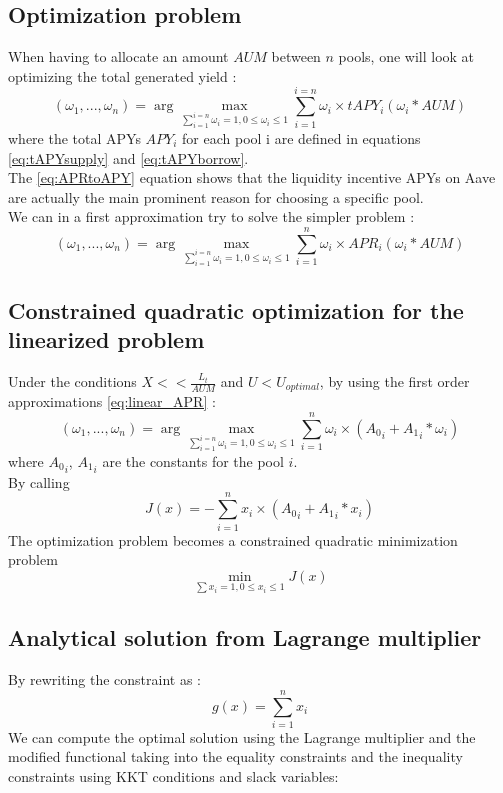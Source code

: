 \documentclass[conference]{IEEEtran}
\begin{document}
\subsection{Optimization problem}
When having to allocate an amount $AUM$ between $n$ pools, one will look at optimizing the total generated yield :  
\begin{equation}
 \left( \omega_1,...,\omega_n \right)   =  \arg \max_{ \sum_{i = 1}^{i = n} \omega_i = 1,0\le \omega_i \le 1} { \sum_{i = 1}^{i = n} \omega_i \times tAPY_i\left(\omega_i * AUM \right) }
\end{equation}
where the total APYs $APY_i$ for each pool i are defined in equations \ref{eq:tAPYsupply} and \ref{eq:tAPYborrow}.\\
The \ref{eq:APRtoAPY} equation shows that the liquidity incentive APYs on Aave are actually the main prominent reason for choosing a specific pool.\\
We can in a first approximation try to solve the simpler problem :
\begin{equation}\label{eq:optim}
 \left( \omega_1,...,\omega_n \right)   =  \arg \max_{ \sum_{i = 1}^{i = n} \omega_i = 1,0\le \omega_i \le 1} { \sum_{i = 1}^{n} \omega_i \times APR_i\left(\omega_i * AUM \right) }
\end{equation}
\subsection{Constrained quadratic optimization for the linearized problem}
Under the conditions $X<<\frac{L_t}{AUM}$ and $U<U_{optimal}$, by using the first order approximations \ref{eq:linear_APR} :
$$
 \left( \omega_1,...,\omega_n \right)   =  \arg \max_{ \sum_{i = 1}^{i = n} \omega_i = 1,0\le \omega_i \le 1} { \sum_{i = 1}^{n} \omega_i \times \left( {A_0}_i   + {A_1}_i * \omega_i\right) }
$$
where ${A_0}_i$, ${A_1}_i$ are the constants for the pool $i$.\\
By calling
$$
J(x)=- \sum_{i = 1}^{n} x_i \times \left( {A_0}_i   + {A_1}_i * x_i \right)
$$
The optimization problem becomes a constrained quadratic minimization problem
$$
\min\limits_{\sum x_i =1,0\le x_i \le 1} {J(x)}
$$
\subsection{Analytical solution from Lagrange multiplier}
By rewriting the constraint as :
$$
g(x) = \sum_{i = 1}^{n} x_i
$$
We can compute the optimal solution using the Lagrange multiplier and the modified functional taking into the equality constraints and the inequality constraints using KKT conditions and slack variables:
\end{document}
